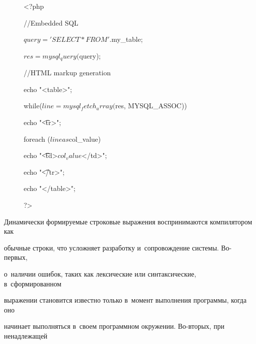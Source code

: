 \begin{figure} %


\begin{center}


\begin{boxedverbatim}


<?php 


//Embedded SQL


$query = 'SELECT * FROM '. $my_table;


$res = mysql_query($query);


//HTML markup generation


echo "<table>\n";


while($line=mysql_fetch_array($res, MYSQL_ASSOC))


   {echo "\t<tr>\n";    


   foreach ($line as $col_value)


   {echo "\t\t<td>$col_value$</td>\n";}


   echo "\t</tr>\n";}


echo "</table>\n";


?>


\end{boxedverbatim}


\end{center}





\vspace*{-6pt}




\label{lst:verbments2}


\vspace*{-12pt}


\end{figure}





Динамически формируемые строковые выражения воспринимаются компилятором как 


обычные строки, что усложняет разработку и~сопровождение системы. Во-пер\-вых, 


о~наличии ошибок, таких как лексические или синтаксические, в~сформированном 


выражении становится известно только в~момент выполнения программы, когда оно 


начинает выполняться в~своем программном окружении. Во-вто\-рых,  при ненадлежащей 


